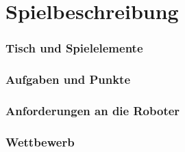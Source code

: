 \section{Spielbeschreibung}

\begin{frame}
	\frametitle{Tisch und Spielelemente}
	
\end{frame}

\begin{frame}
	\frametitle{Aufgaben und Punkte}
	
\end{frame}

\begin{frame}
	\frametitle{Anforderungen an die Roboter}
	
\end{frame}

\begin{frame}
	\frametitle{Wettbewerb}
	
\end{frame}